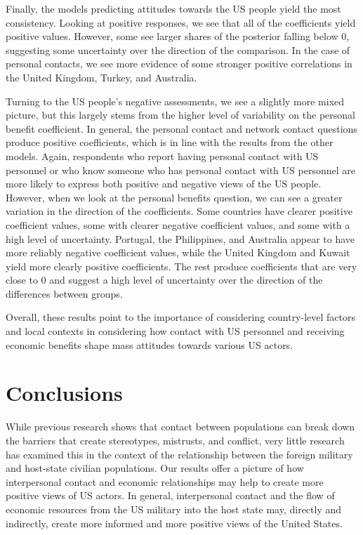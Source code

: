 Finally, the models predicting attitudes towards the US people yield the most consistency. Looking at positive responses, we see that all of the coefficients yield positive values. However, some see larger shares of the posterior falling below 0, suggesting some uncertainty over the direction of the comparison. In the case of personal contacts, we see more evidence of some stronger positive correlations in the United Kingdom, Turkey, and Australia. 

Turning to the US people's negative assessments, we see a slightly more mixed picture, but this largely stems from the higher level of variability on the personal benefit coefficient. In general, the personal contact and network contact questions produce positive coefficients, which is in line with the results from the other models. Again, respondents who report having personal contact with US personnel or who know someone who has personal contact with US personnel are more likely to express both positive and negative views of the US people. However, when we look at the personal benefits question, we can see a greater variation in the direction of the coefficients. Some countries have clearer positive coefficient values, some with clearer negative coefficient values, and some with a high level of uncertainty. Portugal, the Philippines, and Australia appear to have more reliably negative coefficient values, while the United Kingdom and Kuwait yield more clearly positive coefficients. The rest produce coefficients that are very close to 0 and suggest a high level of uncertainty over the direction of the differences between groups. 

Overall, these results point to the importance of considering country-level factors and local contexts in considering how contact with US personnel and receiving economic benefits shape mass attitudes towards various US actors.



\section*{Conclusions}

While previous research shows that contact between populations can break down the barriers that create stereotypes, mistrusts, and conflict, very little research has examined this in the context of the relationship between the foreign military and host-state civilian populations. Our results offer a picture of how interpersonal contact and economic relationships may help to create more positive views of US actors. In general, interpersonal contact and the flow of economic resources from the US military into the host state may, directly and indirectly, create more informed and more positive views of the United States.

